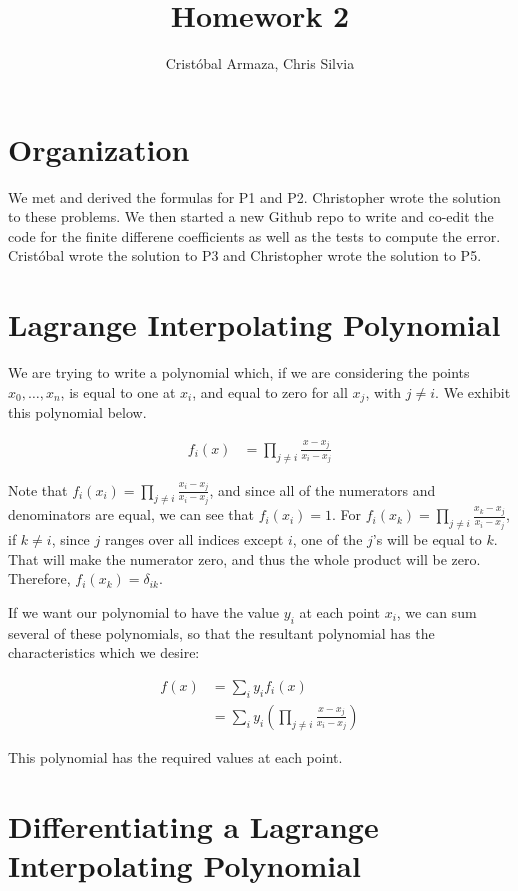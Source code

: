\documentclass{article}
\title{Homework 2}
\author{Crist\'obal Armaza, Chris Silvia}
\begin{document}
\maketitle

\section{Organization}

We met and derived the formulas for P1 and P2. Christopher wrote the solution to these problems.
We then started a new Github repo to write and co-edit the code for the finite differene coefficients
as well as the tests to compute the error. Crist\'obal wrote the solution to P3 and Christopher
wrote the solution to P5.

\section{Lagrange Interpolating Polynomial}

We are trying to write a polynomial which, if we are considering
	the points $x_0, \dots, x_n$, is equal to one at $x_i$,
	and equal to zero for all $x_j$, with $j \neq i$.
We exhibit this polynomial below.

\begin{align}
f_i(x) & = \prod_{j \neq i} \frac{x - x_j}{x_i - x_j}
\end{align}

Note that $f_i(x_i) = \prod_{j \neq i} \frac{x_i - x_j}{x_i - x_j}$,
	and since all of the numerators and denominators are equal,
	we can see that $f_i(x_i) = 1$.
For $f_i(x_k) = \prod_{j \neq i} \frac{x_k - x_j}{x_i - x_j}$,
	if $k \neq i$, since $j$ ranges over all indices except $i$,
	one of the $j$'s will be equal to $k$.
That will make the numerator zero, and thus the whole product
	will be zero.
Therefore, $f_i(x_k) = \delta_{ik}$.

If we want our polynomial to have the value $y_i$ at each
	point $x_i$, we can sum several of these polynomials, so that
	the resultant polynomial has the characteristics which we desire:

\begin{align}
f(x) & = \sum_i y_i f_i(x) \\
& = \sum_i y_i 
	\left( \prod_{j \neq i} \frac{x-x_j}{x_i-x_j} \right)
\end{align}

This polynomial has the required values at each point.

\section{Differentiating a Lagrange Interpolating Polynomial}
\end{document}
